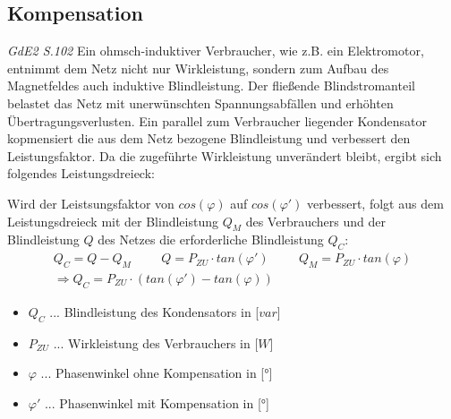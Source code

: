 \subsection{Kompensation}
\textit{GdE2 S.102}
Ein ohmsch-induktiver Verbraucher, wie z.B. ein Elektromotor, entnimmt dem Netz nicht nur Wirkleistung, sondern zum Aufbau des Magnetfeldes auch induktive Blindleistung. Der fließende Blindstromanteil belastet das Netz mit unerwünschten Spannungsabfällen und erhöhten Übertragungsverlusten. Ein parallel zum Verbraucher liegender Kondensator kopmensiert die aus dem Netz bezogene Blindleistung und verbessert den Leistungsfaktor. Da die zugeführte Wirkleistung unverändert bleibt, ergibt sich folgendes Leistungsdreieck:

\begin{center}
\end{center}
    
Wird der Leistsungsfaktor von $cos(\varphi)$ auf $cos(\varphi')$ verbessert, folgt aus dem Leistungsdreieck mit der Blindleistung $Q_M$ des Verbrauchers und der Blindleistung $Q$ des Netzes die erforderliche Blindleistung $Q_C$:
\begin{align}
    Q_C = Q - Q_M
    \hspace{1cm}
    Q = P_{ZU} \cdot tan(\varphi')
    \hspace{1cm}
    Q_M = P_{ZU} \cdot tan(\varphi) \\
    \Rightarrow Q_C = P_{ZU} \cdot (tan(\varphi') - tan(\varphi))
\end{align}

\begin{itemize}
    \item $Q_C$ ... Blindleistung des Kondensators in [$var$]
    \item $P_{ZU}$ ... Wirkleistung des Verbrauchers in [$W$]
    \item $\varphi$ ... Phasenwinkel ohne Kompensation in [$°$]
    \item $\varphi'$ ... Phasenwinkel mit Kompensation in [$°$]
\end{itemize}